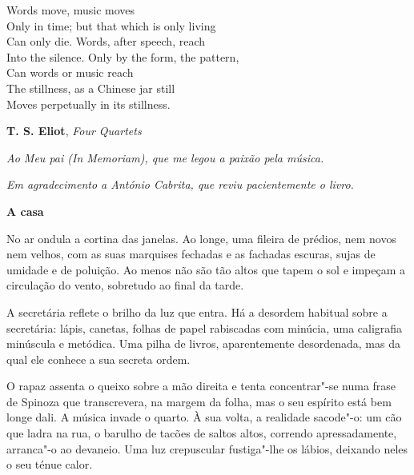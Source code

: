 \movetooddpage
\thispagestyle{empty}
\begin{vplace}[0.8]
\begin{flushright}
Words move, music moves\\
Only in time; but that which is only living\\
Can only die. Words, after speech, reach\\
Into the silence. Only by the form, the pattern,\\
Can words or music reach\\
The stillness, as a Chinese jar still\\
Moves perpetually in its stillness.

\medskip

\textbf{T. S. Eliot}, \emph{Four Quartets}
\end{flushright}
\end{vplace}
\pagebreak

\thispagestyle{empty}
\begin{flushright}
\begin{vplace}[0.8]
\emph{Ao Meu pai (\emph{In Memoriam}), que me legou a paixão pela música.}

\medskip

\emph{Em agradecimento a António Cabrita, que reviu pacientemente o livro.}
\end{vplace}
\end{flushright}

\vspace*{1.8cm}
\noindent{}\textbf{A casa}

\bigskip

No ar ondula a cortina das janelas. Ao longe, uma fileira de prédios,
nem novos nem velhos, com as suas marquises fechadas e as fachadas
escuras, sujas de umidade e de poluição. Ao menos não são tão altos que
tapem o sol e impeçam a circulação do vento, sobretudo ao final da
tarde.

A secretária reflete o brilho da luz que entra. Há a desordem habitual
sobre a secretária: lápis, canetas, folhas de papel rabiscadas com
minúcia, uma caligrafia minúscula e metódica. Uma pilha de livros,
aparentemente desordenada, mas da qual ele conhece a sua secreta ordem.

O rapaz assenta o queixo sobre a mão direita e tenta concentrar"-se numa
frase de Spinoza que transcrevera, na margem da folha, mas o seu
espírito está bem longe dali. A música invade o quarto. À sua volta, a
realidade sacode"-o: um cão que ladra na rua, o barulho de tacões de
saltos altos, correndo apressadamente, arranca"-o ao devaneio. Uma luz
crepuscular fustiga"-lhe os lábios, deixando neles o seu ténue calor.


